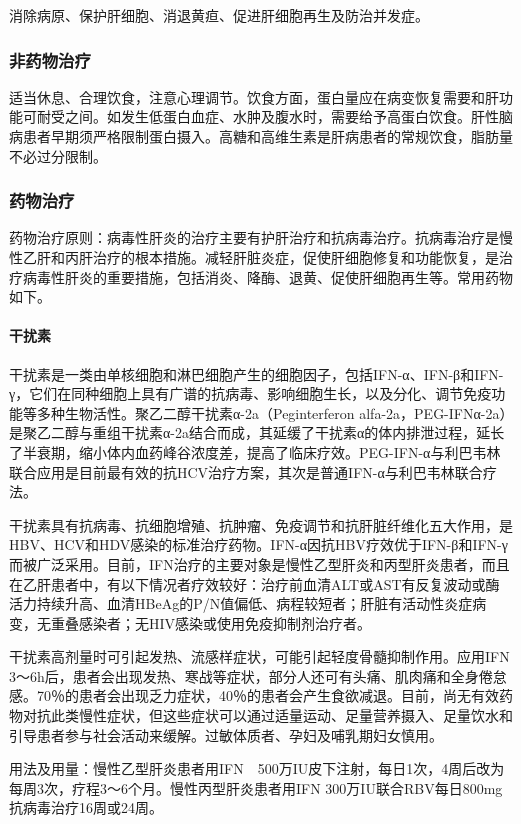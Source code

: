 消除病原、保护肝细胞、消退黄疸、促进肝细胞再生及防治并发症。

\subsubsection{非药物治疗}

适当休息、合理饮食，注意心理调节。饮食方面，蛋白量应在病变恢复需要和肝功能可耐受之间。如发生低蛋白血症、水肿及腹水时，需要给予高蛋白饮食。肝性脑病患者早期须严格限制蛋白摄入。高糖和高维生素是肝病患者的常规饮食，脂肪量不必过分限制。

\subsubsection{药物治疗}

药物治疗原则：病毒性肝炎的治疗主要有护肝治疗和抗病毒治疗。抗病毒治疗是慢性乙肝和丙肝治疗的根本措施。减轻肝脏炎症，促使肝细胞修复和功能恢复，是治疗病毒性肝炎的重要措施，包括消炎、降酶、退黄、促使肝细胞再生等。常用药物如下。
\paragraph{干扰素}

干扰素是一类由单核细胞和淋巴细胞产生的细胞因子，包括IFN-α、IFN-β和IFN-γ，它们在同种细胞上具有广谱的抗病毒、影响细胞生长，以及分化、调节免疫功能等多种生物活性。聚乙二醇干扰素α-2a（Peginterferon
alfa-2a，PEG-IFNα-2a）是聚乙二醇与重组干扰素α-2a结合而成，其延缓了干扰素α的体内排泄过程，延长了半衰期，缩小体内血药峰谷浓度差，提高了临床疗效。PEG-IFN-α与利巴韦林联合应用是目前最有效的抗HCV治疗方案，其次是普通IFN-α与利巴韦林联合疗法。

干扰素具有抗病毒、抗细胞增殖、抗肿瘤、免疫调节和抗肝脏纤维化五大作用，是HBV、HCV和HDV感染的标准治疗药物。IFN-α因抗HBV疗效优于IFN-β和IFN-γ而被广泛采用。目前，IFN治疗的主要对象是慢性乙型肝炎和丙型肝炎患者，而且在乙肝患者中，有以下情况者疗效较好：治疗前血清ALT或AST有反复波动或酶活力持续升高、血清HBeAg的P/N值偏低、病程较短者；肝脏有活动性炎症病变，无重叠感染者；无HIV感染或使用免疫抑制剂治疗者。

干扰素高剂量时可引起发热、流感样症状，可能引起轻度骨髓抑制作用。应用IFN
3～6h后，患者会出现发热、寒战等症状，部分人还可有头痛、肌肉痛和全身倦怠感。70％的患者会出现乏力症状，40％的患者会产生食欲减退。目前，尚无有效药物对抗此类慢性症状，但这些症状可以通过适量运动、足量营养摄入、足量饮水和引导患者参与社会活动来缓解。过敏体质者、孕妇及哺乳期妇女慎用。

用法及用量：慢性乙型肝炎患者用IFN　500万IU皮下注射，每日1次，4周后改为每周3次，疗程3～6个月。慢性丙型肝炎患者用IFN
300万IU联合RBV每日800mg抗病毒治疗16周或24周。

